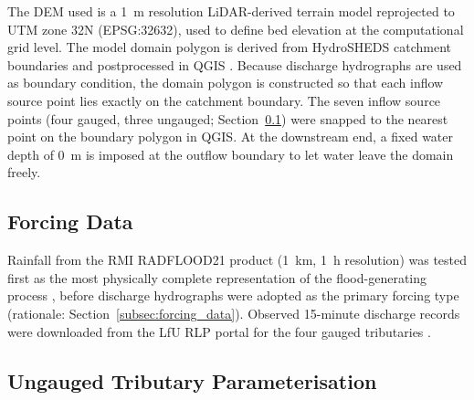 \documentclass[12pt,a4paper]{report}
\begin{document}
The DEM used is a 1~m resolution LiDAR-derived terrain model reprojected to UTM zone
32N (EPSG:32632), used to define bed elevation at the computational grid level. The
model domain polygon is derived from HydroSHEDS catchment boundaries
\citep{lehner2008hydrosheds} and postprocessed in QGIS \citep{qgis2026}.
Because discharge hydrographs are used as boundary condition, the domain polygon is constructed
so that each inflow source point lies exactly on the catchment boundary. The seven inflow source points (four
gauged, three ungauged; Section~\ref{subsec:forcing_ahr}) were snapped to the nearest
point on the boundary polygon in QGIS. At the downstream end, a fixed water depth of
0~m is imposed at the outflow boundary to let water leave the domain freely.

\subsection{Forcing Data}
\label{subsec:forcing_ahr}

Rainfall from the RMI RADFLOOD21 product (1~km, 1~h resolution) was tested first as the
most physically complete representation of the flood-generating process \citep{beven2012rainfall},
before discharge hydrographs were adopted as the primary forcing type
(rationale: Section~\ref{subsec:forcing_data}). Observed 15-minute discharge records
were downloaded from the LfU RLP portal for the four gauged tributaries \citep{lfurlp2022bericht}.

\subsection{Ungauged Tributary Parameterisation}
\label{subsec:ungauged_ahr}
\end{document}
